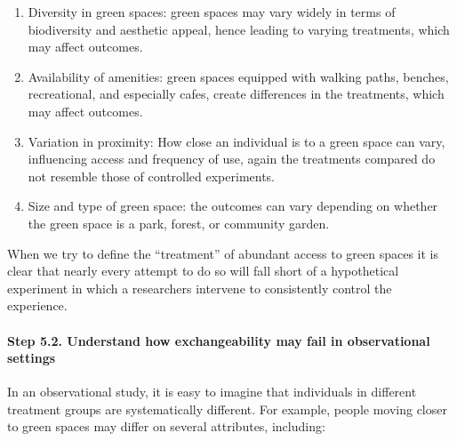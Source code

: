 \documentclass[
  singlecolumn]{article}
\let\oldparagraph\paragraph
\renewcommand{\paragraph}[1]{\oldparagraph{#1}\mbox{}}
\begin{document}
\begin{enumerate}
\def\labelenumi{\alph{enumi}.}
\item
  Diversity in green spaces: green spaces may vary widely in terms of
  biodiversity and aesthetic appeal, hence leading to varying
  treatments, which may affect outcomes.
\item
  Availability of amenities: green spaces equipped with walking paths,
  benches, recreational, and especially cafes, create differences in the
  treatments, which may affect outcomes.
\item
  Variation in proximity: How close an individual is to a green space
  can vary, influencing access and frequency of use, again the
  treatments compared do not resemble those of controlled experiments.
\item
  Size and type of green space: the outcomes can vary depending on
  whether the green space is a park, forest, or community garden.
\end{enumerate}

When we try to define the ``treatment'' of abundant access to green
spaces it is clear that nearly every attempt to do so will fall short of
a hypothetical experiment in which a researchers intervene to
consistently control the experience.

\hypertarget{step-5.2.-understand-how-exchangeability-may-fail-in-observational-settings}{%
\paragraph{\texorpdfstring{\textbf{Step 5.2. Understand how
exchangeability may fail in observational
settings}}{Step 5.2. Understand how exchangeability may fail in observational settings}}\label{step-5.2.-understand-how-exchangeability-may-fail-in-observational-settings}}

In an observational study, it is easy to imagine that individuals in
different treatment groups are systematically different. For example,
people moving closer to green spaces may differ on several attributes,
including:
\end{document}
